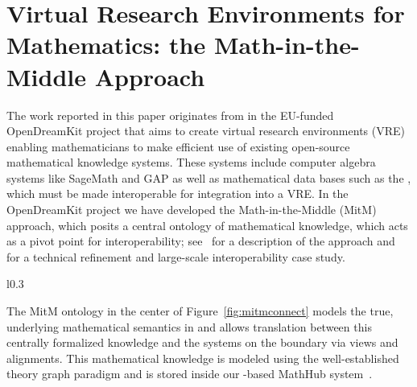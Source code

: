 \section{Virtual Research Environments for Mathematics: the Math-in-the-Middle
  Approach}\label{sec:mmtmitm}

The work reported in this paper originates from in the EU-funded \textsf{OpenDreamKit}
\cite{OpenDreamKit:on} project that aims to create virtual research environments (VRE)
enabling mathematicians to make efficient use of existing open-source mathematical
knowledge systems.  These systems include computer algebra systems like SageMath and GAP
as well as mathematical data bases such as the \lmfdb, which must be made interoperable
for integration into a VRE. In the \textsf{OpenDreamKit} project we have developed the
Math-in-the-Middle (MitM) approach, which posits a central ontology of mathematical
knowledge, which acts as a pivot point for interoperability; see~\cite{DehKohKon:iop16}
for a description of the approach and \cite{KohMuePfe:kbimss17} for a technical refinement
and large-scale interoperability case study. 

\begin{wrapfigure}l{0.3\textwidth}%
  \caption{The MiTM Approach to Connecting Systems.}\label{fig:mitmconnect}\vspace*{-1em}
\end{wrapfigure}
The MitM ontology in the center of Figure~\ref{fig:mitmconnect} models the true,
underlying mathematical semantics in \ommt and allows translation between this centrally
formalized knowledge and the systems on the boundary via views and alignments.
This mathematical knowledge is modeled using the well-established theory graph paradigm
and is stored inside our \ommt-based MathHub system~\cite{MathHub:on}. 

